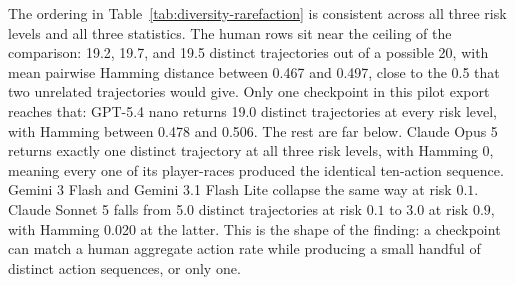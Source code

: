 \documentclass[sigconf,anonymous]{aamas}
\begin{document}
The ordering in Table~\ref{tab:diversity-rarefaction} is consistent across all
three risk levels and all three statistics. The human rows sit near the
ceiling of the comparison: 19.2, 19.7, and 19.5 distinct trajectories out of a
possible 20, with mean pairwise Hamming distance between 0.467 and 0.497,
close to the 0.5 that two unrelated trajectories would give. Only one
checkpoint in this pilot export reaches that: GPT-5.4 nano returns 19.0
distinct trajectories at
every risk level, with Hamming between 0.478 and 0.506. The rest are far
below. Claude Opus 5 returns exactly one distinct trajectory at all three risk
levels, with Hamming 0, meaning every one of its player-races produced the
identical ten-action sequence. Gemini 3 Flash and Gemini 3.1 Flash Lite
collapse the same way at risk $0.1$. Claude Sonnet 5 falls from 5.0 distinct
trajectories at risk $0.1$ to 3.0 at risk $0.9$, with Hamming 0.020 at the
latter. This is the shape of the finding: a checkpoint
can match a human aggregate action rate while producing a small handful of
distinct action sequences, or only one.
\end{document}
